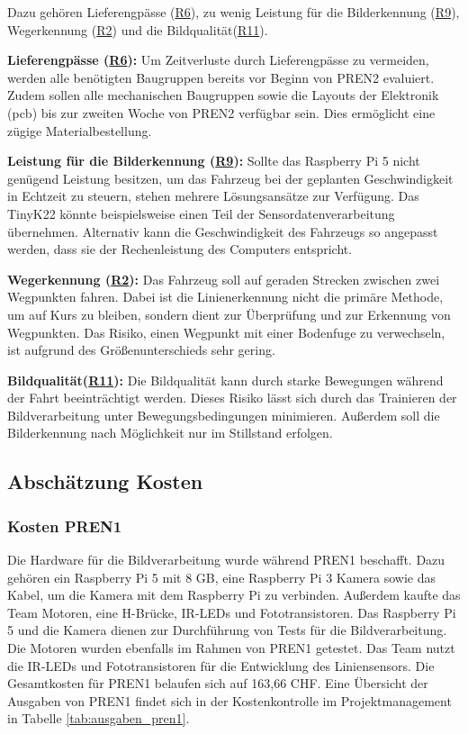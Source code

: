 \documentclass[../main.tex]{subfiles}
\begin{document}
Dazu gehören Lieferengpässe (\hyperlink{R6}{R6}), zu wenig Leistung für die Bilderkennung (\hyperlink{R9}{R9}), Wegerkennung (\hyperlink{R2}{R2}) und die Bildqualität(\hyperlink{R11}{R11}). 

\textbf{Lieferengpässe (\hyperlink{R6}{R6}):} Um Zeitverluste durch Lieferengpässe zu vermeiden, werden alle benötigten Baugruppen bereits vor Beginn von PREN2 evaluiert. Zudem sollen alle mechanischen Baugruppen sowie die Layouts der Elektronik (\acrshort{pcb}) bis zur zweiten Woche von PREN2 verfügbar sein. Dies ermöglicht eine zügige Materialbestellung.

\textbf{Leistung für die Bilderkennung (\hyperlink{R9}{R9}):} Sollte das Raspberry Pi 5 nicht genügend Leistung besitzen, um das Fahrzeug bei der geplanten Geschwindigkeit in Echtzeit zu steuern, stehen mehrere Lösungsansätze zur Verfügung. Das TinyK22 könnte beispielsweise einen Teil der Sensordatenverarbeitung übernehmen. Alternativ kann die Geschwindigkeit des Fahrzeugs so angepasst werden, dass sie der Rechenleistung des Computers entspricht.

\textbf{Wegerkennung (\hyperlink{R2}{R2}):} Das Fahrzeug soll auf geraden Strecken zwischen zwei Wegpunkten fahren. Dabei ist die Linienerkennung nicht die primäre Methode, um auf Kurs zu bleiben, sondern dient zur Überprüfung und zur Erkennung von Wegpunkten. Das Risiko, einen Wegpunkt mit einer Bodenfuge zu verwechseln, ist aufgrund des Größenunterschieds sehr gering.

\textbf{Bildqualität(\hyperlink{R11}{R11}):} Die Bildqualität kann durch starke Bewegungen während der Fahrt beeinträchtigt werden. Dieses Risiko lässt sich durch das Trainieren der Bildverarbeitung unter Bewegungsbedingungen minimieren. Außerdem soll die Bilderkennung nach Möglichkeit nur im Stillstand erfolgen.

\subsection{Abschätzung Kosten}

\subsubsection{Kosten PREN1}
Die Hardware für die Bildverarbeitung wurde während PREN1 beschafft. Dazu gehören ein Raspberry Pi 5 mit 8 GB, eine Raspberry Pi 3 Kamera sowie das Kabel, um die Kamera mit dem Raspberry Pi zu verbinden. Außerdem kaufte das Team Motoren, eine H-Brücke, IR-LEDs und Fototransistoren. Das Raspberry Pi 5 und die Kamera dienen zur Durchführung von Tests für die Bildverarbeitung. Die Motoren wurden ebenfalls im Rahmen von PREN1 getestet. Das Team nutzt die IR-LEDs und Fototransistoren für die Entwicklung des Liniensensors. Die Gesamtkosten für PREN1 belaufen sich auf 163,66 CHF. Eine Übersicht der Ausgaben von PREN1 findet sich in der Kostenkontrolle im Projektmanagement in Tabelle \ref{tab:ausgaben_pren1}.
\end{document}
